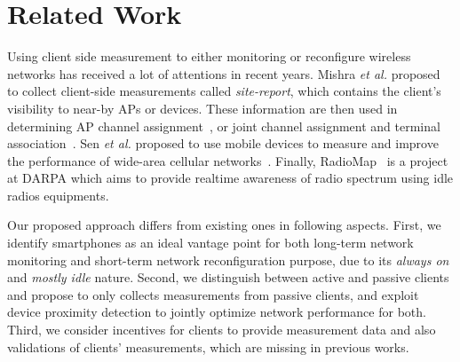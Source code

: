 \section{Related Work}
\label{sec:related}

Using client side measurement to either monitoring or reconfigure wireless
networks has received a lot of attentions in recent years. Mishra \textit{et al.}
proposed to collect client-side measurements called \textit{site-report}, which
contains the client's visibility to near-by APs or devices. These information
are then used in determining AP channel
assignment~\cite{mishra:mccr2005,dasilva:mswim2008,mishra:mobicom2006}, or joint
channel assignment and terminal association~\cite{mishra:infocom2006}. Sen
\textit{et al.} proposed to use mobile devices to measure and improve the performance of
wide-area cellular networks~\cite{sen2011can}. Finally, RadioMap~\cite{radiomap}
is a project at DARPA which aims to provide realtime awareness of radio spectrum
using idle radios equipments.

Our proposed approach differs from existing ones in following aspects. First, we
identify smartphones as an ideal vantage point for both long-term network
monitoring and short-term network reconfiguration purpose, due to its
\textit{always on } and \textit{mostly idle} nature. Second, we distinguish
between active and passive clients and propose to only collects measurements
from passive clients, and exploit device proximity detection to jointly optimize
network performance for both.  Third, we consider incentives for clients to
provide measurement data and also validations of clients' measurements, which
are missing in previous works.
